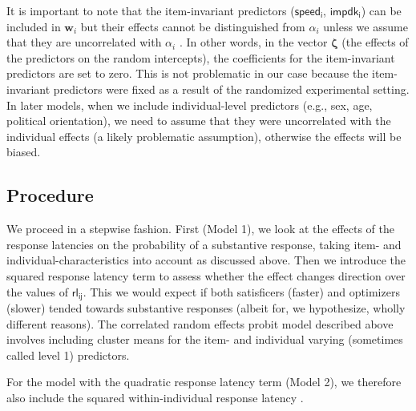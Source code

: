 \documentclass[Royal,times,sageh]{sagej}
\begin{document}
It is important to note that the item-invariant predictors
(\(\mathsf{speed_{i}}\), \(\mathsf{impdk_{i}}\)) can be included in
\(\bm{w}_{i}\) but their effects cannot be distinguished from
\(\alpha_{i}\) unless we assume that they are uncorrelated with
\(\alpha_{i}\) \citep[p.~488]{Wooldridge2002}. In other words, in the
vector \(\bm{\zeta}\) (the effects of the predictors on the random
intercepts), the coefficients for the item-invariant predictors are set
to zero. This is not problematic in our case because the item-invariant
predictors were fixed as a result of the randomized experimental
setting. In later models, when we include individual-level predictors
(e.g., sex, age, political orientation), we need to assume that they
were uncorrelated with the individual effects (a likely problematic
assumption), otherwise the effects will be biased.

\hypertarget{procedure}{%
\subsection{Procedure}\label{procedure}}

We proceed in a stepwise fashion. First (Model 1), we look at the
effects of the response latencies on the probability of a substantive
response, taking item- and individual-characteristics into account as
discussed above. Then we introduce the squared response latency term to
assess whether the effect changes direction over the values of
\(\mathsf{rl_{ij}}\). This we would expect if both satisficers (faster)
and optimizers (slower) tended towards substantive responses (albeit
for, we hypothesize, wholly different reasons). The correlated random
effects probit model described above involves including cluster means
for the item- and individual varying (sometimes called level 1)
predictors.

For the model with the quadratic response latency term (Model 2), we
therefore also include the squared within-individual response latency
\citep[as per][p.~97]{Schunck2017}.
\end{document}
